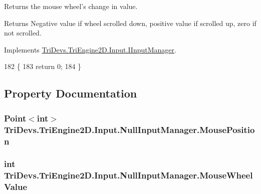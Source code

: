 Returns the mouse wheel's change in value. 

\begin{DoxyReturn}{Returns}
Negative value if wheel scrolled down, positive value if scrolled up, zero if not scrolled.
\end{DoxyReturn}


Implements \hyperlink{interface_tri_devs_1_1_tri_engine2_d_1_1_input_1_1_i_input_manager_afbd3f200724d419be432da3a2dc639bd}{Tri\-Devs.\-Tri\-Engine2\-D.\-Input.\-I\-Input\-Manager}.


\begin{DoxyCode}
182         \{
183             \textcolor{keywordflow}{return} 0;
184         \}
\end{DoxyCode}


\subsection{Property Documentation}
\hypertarget{class_tri_devs_1_1_tri_engine2_d_1_1_input_1_1_null_input_manager_abb1ad59167b8d6039002a223c637eb4d}{
\subsubsection[{Mouse\-Position}]{\setlength{\rightskip}{0pt plus 5cm}Point$<$int$>$ Tri\-Devs.\-Tri\-Engine2\-D.\-Input.\-Null\-Input\-Manager.\-Mouse\-Position\hspace{0.3cm}{\ttfamily [get]}}}\label{class_tri_devs_1_1_tri_engine2_d_1_1_input_1_1_null_input_manager_abb1ad59167b8d6039002a223c637eb4d}
\hypertarget{class_tri_devs_1_1_tri_engine2_d_1_1_input_1_1_null_input_manager_a7afee03cecf29b1cc123fe7a03b239df}{
\subsubsection[{Mouse\-Wheel\-Value}]{\setlength{\rightskip}{0pt plus 5cm}int Tri\-Devs.\-Tri\-Engine2\-D.\-Input.\-Null\-Input\-Manager.\-Mouse\-Wheel\-Value\hspace{0.3cm}{\ttfamily [get]}}}\label{class_tri_devs_1_1_tri_engine2_d_1_1_input_1_1_null_input_manager_a7afee03cecf29b1cc123fe7a03b239df}
